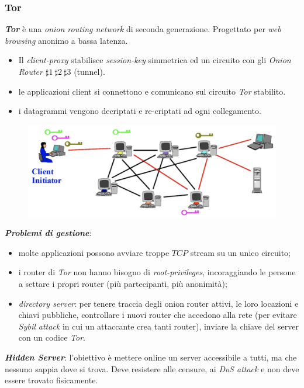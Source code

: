 \documentclass[11pt, a4paper, twoside, italian]{report}
\theoremstyle{plain}
\begin{document}
\subsubsection*{Tor}
\textit{\textbf{Tor}} è una \textit{onion routing network} di seconda generazione. Progettato per \textit{web browsing} anonimo a bassa latenza.
\begin{multicols}{2}
\begin{itemize}
	\item Il \textit{client-proxy} stabilisce \textit{session-key} simmetrica ed un circuito con gli \textit{Onion Router $\sharp1~\sharp2~\sharp3$} (tunnel).
	\item le applicazioni client si connettono e comunicano sul circuito \textit{Tor} stabilito.
	\item i datagrammi vengono decriptati e re-criptati ad ogni collegamento.
\end{itemize}
\columnbreak
\begin{figure}[H]
	\centering
	\includegraphics[scale=0.45]{tor}
\end{figure}
\end{multicols}
\noindent
\textit{\textbf{Problemi di gestione}}: \begin{itemize}
	\item molte applicazioni possono avviare troppe $TCP$ stream su un unico circuito;
	\item i router di \textit{Tor} non hanno bisogno di \textit{root-privileges}, incoraggiando le persone a settare i propri router (più partecipanti, più anonimità);
	\item \textit{directory server}: per tenere traccia degli onion router attivi, le loro locazioni e chiavi pubbliche, controllare i nuovi router che accedono alla rete (per evitare \textit{Sybil attack} in cui un attaccante crea tanti router), inviare la chiave del server con un codice \textit{Tor}.
\end{itemize}
\noindent
\textit{\textbf{Hidden Server}}: l'obiettivo è mettere online un server accessibile a tutti, ma che nessuno sappia dove si trova. Deve resistere alle censure, ai \textit{DoS attack} e non deve essere trovato fisicamente.
\end{document}
